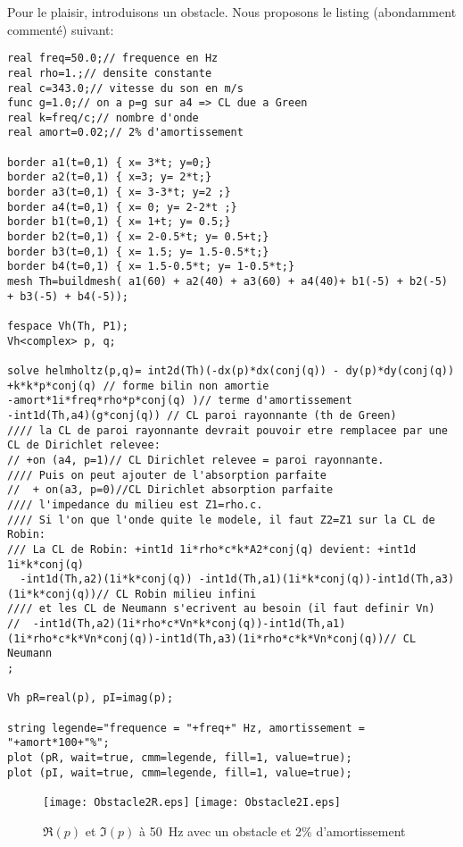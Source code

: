 Pour le plaisir, introduisons un obstacle. Nous proposons le listing \freefem (abondamment commenté) suivant:
\begin{lstlisting}[firstnumber=1]
real freq=50.0;// frequence en Hz
real rho=1.;// densite constante
real c=343.0;// vitesse du son en m/s
func g=1.0;// on a p=g sur a4 => CL due a Green
real k=freq/c;// nombre d'onde
real amort=0.02;// 2% d'amortissement

border a1(t=0,1) { x= 3*t; y=0;}
border a2(t=0,1) { x=3; y= 2*t;}
border a3(t=0,1) { x= 3-3*t; y=2 ;}
border a4(t=0,1) { x= 0; y= 2-2*t ;}
border b1(t=0,1) { x= 1+t; y= 0.5;}
border b2(t=0,1) { x= 2-0.5*t; y= 0.5+t;}
border b3(t=0,1) { x= 1.5; y= 1.5-0.5*t;}
border b4(t=0,1) { x= 1.5-0.5*t; y= 1-0.5*t;}
mesh Th=buildmesh( a1(60) + a2(40) + a3(60) + a4(40)+ b1(-5) + b2(-5) + b3(-5) + b4(-5));

fespace Vh(Th, P1);
Vh<complex> p, q;

solve helmholtz(p,q)= int2d(Th)(-dx(p)*dx(conj(q)) - dy(p)*dy(conj(q)) +k*k*p*conj(q) // forme bilin non amortie
-amort*1i*freq*rho*p*conj(q) )// terme d'amortissement
-int1d(Th,a4)(g*conj(q)) // CL paroi rayonnante (th de Green)
//// la CL de paroi rayonnante devrait pouvoir etre remplacee par une CL de Dirichlet relevee:
// +on (a4, p=1)// CL Dirichlet relevee = paroi rayonnante.
//// Puis on peut ajouter de l'absorption parfaite
//  + on(a3, p=0)//CL Dirichlet absorption parfaite
//// l'impedance du milieu est Z1=rho.c. 
//// Si l'on que l'onde quite le modele, il faut Z2=Z1 sur la CL de Robin: 
/// La CL de Robin: +int1d 1i*rho*c*k*A2*conj(q) devient: +int1d 1i*k*conj(q)
  -int1d(Th,a2)(1i*k*conj(q)) -int1d(Th,a1)(1i*k*conj(q))-int1d(Th,a3)(1i*k*conj(q))// CL Robin milieu infini
//// et les CL de Neumann s'ecrivent au besoin (il faut definir Vn)
//  -int1d(Th,a2)(1i*rho*c*Vn*k*conj(q))-int1d(Th,a1)(1i*rho*c*k*Vn*conj(q))-int1d(Th,a3)(1i*rho*c*k*Vn*conj(q))// CL Neumann
;

Vh pR=real(p), pI=imag(p);

string legende="frequence = "+freq+" Hz, amortissement = "+amort*100+"%";
plot (pR, wait=true, cmm=legende, fill=1, value=true);
plot (pI, wait=true, cmm=legende, fill=1, value=true);
\end{lstlisting}
\begin{figure}[h!]
\centering
   \texttt{[image: Obstacle2R.eps]} \hspace{10mm}
   \texttt{[image: Obstacle2I.eps]}
\caption{$\Re(p)$ et $\Im(p)$ à 50~Hz avec un obstacle et 2\% d'amortissement}\label{Fig-Obstacle2}
\end{figure}

